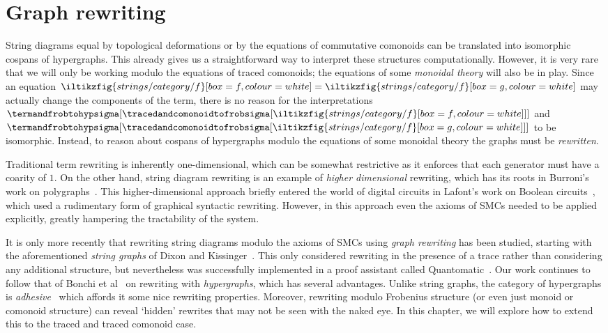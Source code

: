 \chapter{Graph rewriting}\label{chap:rewriting}

String diagrams equal by topological deformations or by the equations of
commutative comonoids can be translated into isomorphic cospans of hypergraphs.
This already gives us a straightforward way to interpret these structures
computationally.
However, it is very rare that we will only be working modulo the equations of
traced comonoids; the equations of some \emph{monoidal theory} will also be in
play.
Since an equation \(
\iltikzfig{strings/category/f}[box=f,colour=white]
=
\iltikzfig{strings/category/f}[box=g,colour=white]
\) may actually change the components of the term, there is no reason for the
interpretations \(
\termandfrobtohypsigma[
    \tracedandcomonoidtofrobsigma[
        \iltikzfig{strings/category/f}[box=f,colour=white]
    ]
]
\) and \(
\termandfrobtohypsigma[
    \tracedandcomonoidtofrobsigma[
        \iltikzfig{strings/category/f}[box=g,colour=white]
    ]
]
\) to be isomorphic.
Instead, to reason about cospans of hypergraphs modulo the equations of some
monoidal theory the graphs must be \emph{rewritten}.

Traditional term rewriting is inherently one-dimensional, which can be somewhat
restrictive as it enforces that each generator must have a coarity of \(1\).
On the other hand, string diagram rewriting is an example of
\emph{higher dimensional} rewriting, which has its roots in Burroni's work on
polygraphs~\cite{burroni1993higherdimensional}.
This higher-dimensional approach briefly entered the world of digital
circuits in Lafont's work on Boolean circuits~\cite{lafont2003algebraic}, which
used a rudimentary form of graphical syntactic rewriting.
However, in this approach even the axioms of SMCs needed to be applied
explicitly, greatly hampering the tractability of the system.

It is only more recently that rewriting string diagrams modulo the axioms of
SMCs using \emph{graph rewriting} has been studied, starting with the
aforementioned \emph{string graphs} of Dixon and
Kissinger~\cite{dixon2010open,kissinger2012pictures,dixon2013opengraphs}.
This only considered rewriting in the presence of a trace rather than
considering any additional structure, but nevertheless was successfully
implemented in a proof assistant called
Quantomatic~\cite{kissinger2015quantomatic}.
Our work continues to follow that of Bonchi et
al~\cite{bonchi2022string,bonchi2022stringa} on rewriting with
\emph{hypergraphs}, which has several advantages.
Unlike string graphs, the category of hypergraphs is
\emph{adhesive}~\cite{lack2004adhesive} which affords it some nice rewriting
properties.
Moreover, rewriting modulo Frobenius structure (or even just monoid or comonoid
structure) can reveal `hidden' rewrites that may not be seen with the naked eye.
In this chapter, we will explore how to extend this to the traced and
traced comonoid case.

